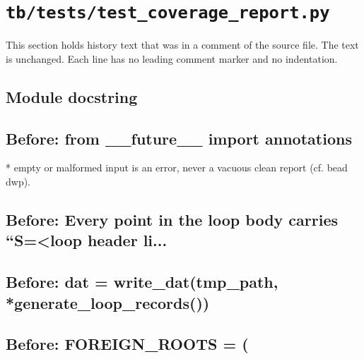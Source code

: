 \section{\texttt{tb/tests/test\_coverage\_report.py}}\label{cr:suite:test-coverage-report}

This section holds history text that was in a comment of the source file. The text is unchanged. Each line has no leading comment marker and no indentation.

\begin{record}

\subsection*{Module docstring}


\subsection*{Before: from \_\_future\_\_ import annotations}

\begin{textblock}
* empty or malformed input is an error, never a vacuous clean report (cf. bead dwp).
\end{textblock}

\subsection*{Before: Every point in the loop body carries ``S=<loop header li...}


\subsection*{Before: dat = write\_dat(tmp\_path, *generate\_loop\_records())}


\subsection*{Before: FOREIGN\_ROOTS = (}


\end{record}
